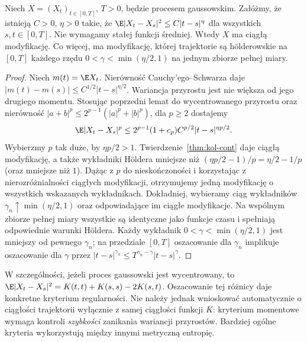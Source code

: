 \begin{wniosek}
Niech $X=(X_t)_{t\in[0,T]}$, $T>0$, będzie procesem gaussowskim.
Załóżmy, że istnieją $C>0$, $\eta>0$ takie, że
$\E|X_t-X_s|^2\le C|t-s|^{\eta}$ dla wszystkich $s,t\in[0,T]$.
Nie wymagamy stałej funkcji średniej.
Wtedy $X$ ma ciągłą modyfikację. Co więcej, ma modyfikację,
której trajektorie są h\"olderowskie na $[0,T]$
każdego rzędu $0<\gamma<\min(\eta/2,1)$
na jednym zbiorze pełnej miary.
\end{wniosek}
\begin{proof}
Niech $m(t)=\E X_t$. Nierówność Cauchy'ego--Schwarza
daje $|m(t)-m(s)|\le C^{1/2}|t-s|^{\eta/2}$.
Wariancja przyrostu jest nie większa od jego drugiego
momentu. Stosując poprzedni lemat do wycentrowanego
przyrostu oraz nierówność
$|a+b|^p\le2^{p-1}(|a|^p+|b|^p)$, dla $p\ge2$ dostajemy
\[
\E|X_t-X_s|^p\le
2^{p-1}(1+c_p)C^{p/2}|t-s|^{\eta p/2}.
\]
Wybierzmy $p$ tak duże, by $\eta p/2>1$.
Twierdzenie~\ref{thm:kol-cont} daje ciągłą modyfikację,
a także wykładniki H\"oldera mniejsze niż
$(\eta p/2-1)/p=\eta/2-1/p$ (oraz mniejsze niż $1$).
Dążąc z $p$ do nieskończoności i korzystając z
nierozróżnialności ciągłych modyfikacji, otrzymujemy
jedną modyfikację o wszystkich wskazanych wykładnikach.
Dokładniej, wybieramy ciąg wykładników
$\gamma_n\uparrow\min(\eta/2,1)$ oraz odpowiadające
im ciągłe modyfikacje. Na wspólnym zbiorze pełnej
miary wszystkie są identyczne jako funkcje czasu
i spełniają odpowiednie warunki H\"oldera.
Każdy wykładnik $0<\gamma<\min(\eta/2,1)$
jest mniejszy od pewnego $\gamma_n$;
na przedziale $[0,T]$ oszacowanie dla $\gamma_n$
implikuje oszacowanie dla $\gamma$ przez
$|t-s|^{\gamma_n}\le T^{\gamma_n-\gamma}|t-s|^\gamma$.
\end{proof}

\begin{uwaga}
W szczególności, jeżeli proces gaussowski jest wycentrowany,
to $\E|X_t-X_s|^2=K(t,t)+K(s,s)-2K(s,t)$.
Oszacowanie tej różnicy daje konkretne kryterium regularności.
Nie należy jednak wnioskować automatycznie o ciągłości
trajektorii wyłącznie z samej ciągłości funkcji $K$:
kryterium momentowe wymaga kontroli \emph{szybkości}
zanikania wariancji przyrostów. Bardziej ogólne kryteria
wykorzystują między innymi metryczną entropię.
\end{uwaga}

